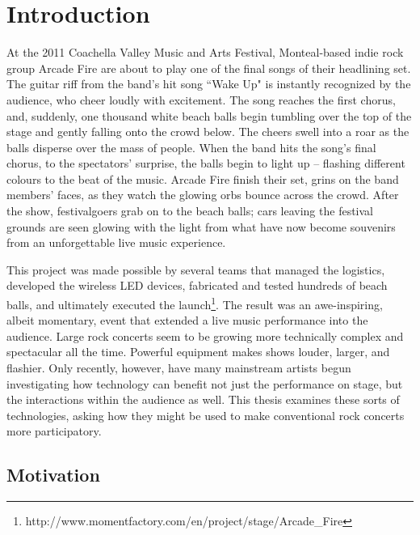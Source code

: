 \chapter{Introduction}

At the 2011 Coachella Valley Music and Arts Festival, Monteal-based indie rock group Arcade Fire are about to play one of the final songs of their headlining set. The guitar riff from the band's hit song ``Wake Up" is instantly recognized by the audience, who cheer loudly with excitement. The song reaches the first chorus, and, suddenly, one thousand white beach balls begin tumbling over the top of the stage and gently falling onto the crowd below. The cheers swell into a roar as the balls disperse over the mass of people. When the band hits the song's final chorus, to the spectators' surprise, the balls begin to light up -- flashing different colours to the beat of the music. Arcade Fire finish their set, grins on the band members' faces, as they watch the glowing orbs bounce across the crowd. After the show, festivalgoers grab on to the beach balls; cars leaving the festival grounds are seen glowing with the light from what have now become souvenirs from an unforgettable live music experience.

This project was made possible by several teams that managed the logistics, developed the wireless LED devices, fabricated and tested hundreds of beach balls, and ultimately executed the launch\footnote{http://www.momentfactory.com/en/project/stage/Arcade\_Fire}. The result was an awe-inspiring, albeit momentary, event that extended a live music performance into the audience. Large rock concerts seem to be growing more technically complex and spectacular all the time. Powerful equipment makes shows louder, larger, and flashier. Only recently, however, have many mainstream artists begun investigating how technology can benefit not just the performance on stage, but the interactions within the audience as well. This thesis examines these sorts of technologies, asking how they might be used to make conventional rock concerts more participatory.




\section{Motivation}

